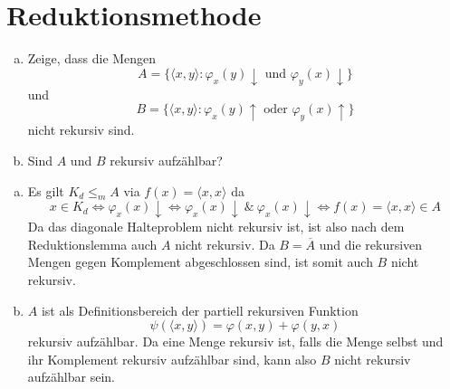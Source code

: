 \documentclass[german,headsepline]{scrartcl}
\theoremstyle{definition}
\begin{document}
	\section{Reduktionsmethode}
	\begin{question}[subtitle={Nachklausur 2012}]
		\begin{enumerate}[(a)]
			\item Zeige, dass die Mengen
				\[A=\{\langle x,y\rangle\colon\varphi_x(y)\downarrow\text{ und }\varphi_y(x)\downarrow\}\]
				und
				\[B=\{\langle x,y\rangle\colon\varphi_x(y)\uparrow\text{ oder }\varphi_y(x)\uparrow\}\]
				nicht rekursiv sind.
			\item Sind $A$ und $B$ rekursiv aufzählbar?
		\end{enumerate}
	\end{question}
	\begin{solution}
		\begin{enumerate}[(a)]
			\item Es gilt $K_d\leq_m A$ via $f(x)=\langle x,x\rangle$ da
				\[x\in K_d\Leftrightarrow\varphi_x(x)\downarrow\Leftrightarrow
				\varphi_x(x)\downarrow~\&~\varphi_x(x)\downarrow\Leftrightarrow
				f(x)=\langle x,x\rangle\in A\]
				Da das diagonale Halteproblem nicht rekursiv ist,
				ist also nach dem Reduktionslemma auch $A$ nicht rekursiv.
				Da $B=\overline{A}$ und die rekursiven Mengen gegen Komplement abgeschlossen sind,
				ist somit auch $B$ nicht rekursiv.
			\item $A$ ist als Definitionsbereich der partiell rekursiven Funktion
				\[\psi(\langle x,y\rangle)=\varphi(x,y)+\varphi(y,x)\]
				rekursiv aufzählbar.
				Da eine Menge rekursiv ist, falls die Menge selbst und ihr Komplement rekursiv aufzählbar sind,
				kann also $B$ nicht rekursiv aufzählbar sein.
		\end{enumerate}
	\end{solution}
	
\end{document}
